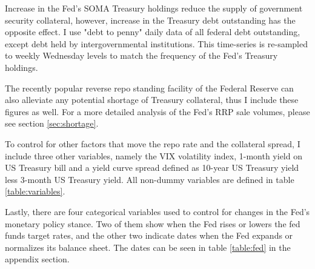 \documentclass[11pt,a4paper,english,oneside]{article}
\begin{document}
Increase in the Fed's SOMA Treasury holdings reduce the supply of government security collateral, however, increase in the Treasury debt outstanding has the opposite effect. I use "debt to penny" daily data of all federal debt outstanding, except debt held by intergovernmental institutions. This time-series is re-sampled to weekly Wednesday levels to match the frequency of the Fed's Treasury holdings.

The recently popular reverse repo standing facility of the Federal Reserve can also alleviate any potential shortage of Treasury collateral, thus I include these figures as well. For a more detailed analysis of the Fed's RRP sale volumes, please see section \ref{sec:shortage}.

To control for other factors that move the repo rate and the collateral spread, I include three other variables, namely the VIX volatility index, 1-month yield on US Treasury bill and a yield curve spread defined as 10-year US Treasury yield less 3-month US Treasury yield. All non-dummy variables are defined in table \ref{table:variables}.

Lastly, there are four categorical variables used to control for changes in the Fed's monetary policy stance. Two of them show when the Fed rises or lowers the fed funds target rates, and the other two indicate dates when the Fed expands or normalizes its balance sheet. The dates can be seen in table \ref{table:fed} in the appendix section.
\end{document}
